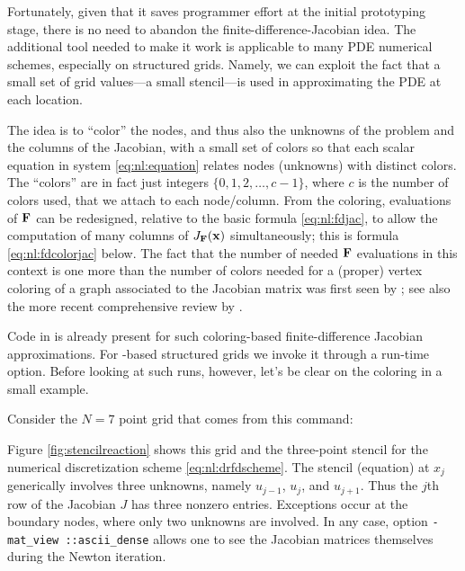 Fortunately, given that it saves programmer effort at the initial prototyping stage, there is no need to abandon the finite-difference-Jacobian idea.  The additional tool needed to make it work is applicable to many PDE numerical schemes, especially on structured grids.  Namely, we can exploit the fact that a small set of grid values---a small stencil---is used in approximating the PDE at each location.

The idea is to ``color'' the nodes, and thus also the unknowns of the problem and the columns of the Jacobian, with a small set of colors so that each scalar equation in system \eqref{eq:nl:equation} relates nodes (unknowns) with distinct colors.  The ``colors'' are in fact just integers $\{0,1,2,\dots,c-1\}$, where $c$ is the number of colors used, that we attach to each node/column.  From the coloring, evaluations of $\mathbf{F}$ can be redesigned, relative to the basic formula \eqref{eq:nl:fdjac}, to allow the computation of many columns of $J_{\mathbf{F}}(\mathbf{x})$ simultaneously; this is formula \eqref{eq:nl:fdcolorjac} below.  The fact that the number of needed $\mathbf{F}$ evaluations in this context is one more than the number of colors needed for a (proper) vertex coloring \citep[e.g.~as defined in][]{ChartrandLesniakZhang2011} of a graph associated to the Jacobian matrix was first seen by \citet{ColemanMore1983}; see also the  more recent comprehensive review by \citet{Gebremedhinetal2005}.

Code in \PETSc is already present for such coloring-based finite-difference Jacobian approximations.  For \pDMDA-based structured grids we invoke it through a run-time option.  Before looking at such runs, however, let's be clear on the coloring in a small example.

Consider the $N=7$ point grid that comes from this command:
Figure \ref{fig:stencilreaction} shows this grid and the three-point stencil for the numerical discretization scheme \eqref{eq:nl:drfdscheme}.  The stencil (equation) at $x_j$ generically involves three unknowns, namely $u_{j-1}$, $u_j$, and $u_{j+1}$.  Thus the $j$th row of the Jacobian $J$ has three nonzero entries.  Exceptions occur at the boundary nodes, where only two unknowns are involved.  In any case, option \texttt{-mat\_view ::ascii\_dense} allows one to see the Jacobian matrices themselves during the Newton iteration.

